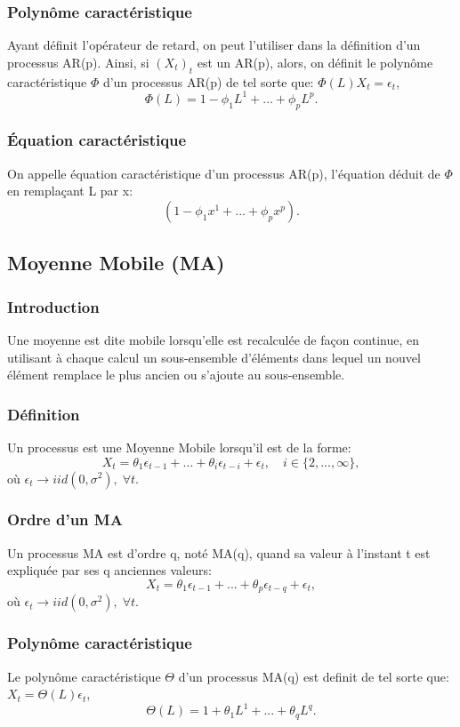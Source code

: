 \documentclass{article}
\begin{document}
\subsubsection{Polynôme caractéristique}
Ayant définit l'opérateur de retard, on peut l'utiliser dans la définition d'un processus AR(p).
\newline
Ainsi, si $(X_t)_t$ est un AR(p), alors, on définit le polynôme caractéristique $\Phi$ d'un processus AR(p) de tel sorte que: $\Phi(L){X_t}=\epsilon_t$,
$$\Phi(L)=1-\phi_1{L^1}+...+\phi_p{L^p}.$$

\subsubsection{Équation caractéristique}
On appelle équation caractéristique d'un processus AR(p), l'équation déduit de $\Phi$ en remplaçant L par x:
$$(1-\phi_1{x^1}+...+\phi_p{x^p}).$$

\subsection{Moyenne Mobile (MA)}

\subsubsection{Introduction}
Une moyenne est dite mobile lorsqu'elle est recalculée de façon continue, en utilisant à chaque calcul un sous-ensemble d'éléments dans lequel un nouvel élément remplace le plus ancien ou s'ajoute au sous-ensemble.

\subsubsection{Définition}
Un processus est une Moyenne Mobile lorsqu'il est de la forme:
$$X_t=\theta_1{\epsilon_{t-1}}+...+\theta_i{\epsilon_{t-i}}+\epsilon_t, \quad i\in\{2,...,\infty\},$$
où $\epsilon_t \rightarrow iid(0,\sigma^2), \; \forall t$.

\subsubsection{Ordre d'un MA}
Un processus MA est d'ordre q, noté MA(q), quand sa valeur à l'instant t est expliquée par ses q anciennes valeurs: 
$$X_t=\theta_1{\epsilon_{t-1}}+...+\theta_p{\epsilon_{t-q}}+\epsilon_t,$$
où $\epsilon_t \rightarrow iid(0,\sigma^2), \; \forall t$.

\subsubsection{Polynôme caractéristique}
Le polynôme caractéristique $\Theta$ d'un processus MA(q) est definit de tel sorte que: $X_t=\Theta(L)\epsilon_t$,
$$\Theta(L)=1+\theta_1{L^1}+...+\theta_q{L^q}.$$
\end{document}
